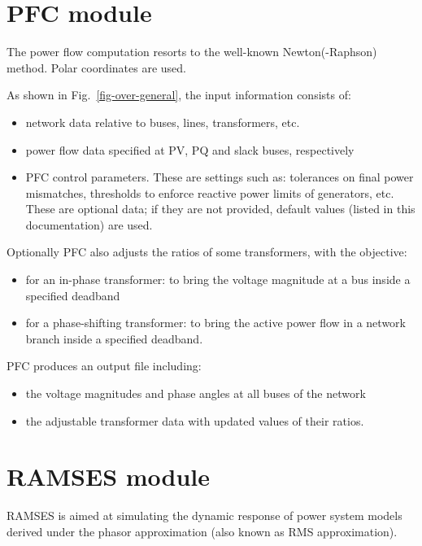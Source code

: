 \section{PFC module}

The power flow computation resorts to the well-known Newton(-Raphson) method. Polar coordinates are used.

As shown in Fig.~\ref{fig-over-general}, the input information consists of:
\begin{itemize}
\item network data relative to buses, lines, transformers, etc.
\item power flow data specified at PV, PQ and slack buses, respectively
\item PFC control parameters. These are settings such as: tolerances on final power mismatches, thresholds to enforce reactive power limits of generators, etc. These are optional data; if they are not provided, default values (listed in this documentation) are used.
\end{itemize}

Optionally PFC also adjusts the ratios of some transformers, with the objective:
\begin{itemize}
\item for an in-phase transformer: to bring the voltage magnitude at a bus inside a specified deadband
\item for a phase-shifting transformer: to bring the active power flow in a network branch inside a specified deadband.
\end{itemize}

PFC produces an output file including:
\begin{itemize}
\item the voltage magnitudes and phase angles at all buses of the network
\item the adjustable transformer data with updated values of their ratios.
\end{itemize}



\section{RAMSES module}

RAMSES is aimed at simulating the dynamic response of power system models derived under the phasor approximation (also known as RMS approximation).

